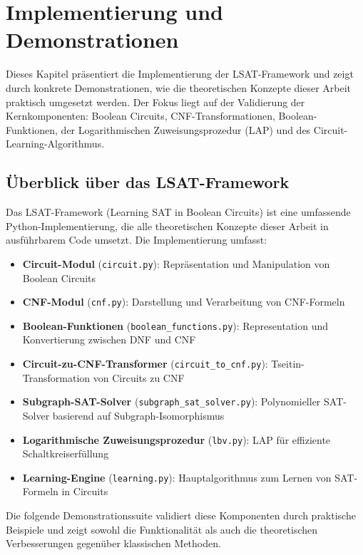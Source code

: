 ﻿\documentclass[a4paper,12pt]{article}
\theoremstyle{definition}
\begin{document}
\section{Implementierung und Demonstrationen}

Dieses Kapitel präsentiert die Implementierung der LSAT-Framework und zeigt durch konkrete Demonstrationen, wie die theoretischen Konzepte dieser Arbeit praktisch umgesetzt werden. Der Fokus liegt auf der Validierung der Kernkomponenten: Boolean Circuits, CNF-Transformationen, Boolean-Funktionen, der Logarithmischen Zuweisungsprozedur (LAP) und des Circuit-Learning-Algorithmus.

\subsection{Überblick über das LSAT-Framework}

Das LSAT-Framework (Learning SAT in Boolean Circuits) ist eine umfassende Python-Implementierung, die alle theoretischen Konzepte dieser Arbeit in ausführbarem Code umsetzt. Die Implementierung umfasst:

\begin{itemize}
    \item \textbf{Circuit-Modul} (\texttt{circuit.py}): Repräsentation und Manipulation von Boolean Circuits
    \item \textbf{CNF-Modul} (\texttt{cnf.py}): Darstellung und Verarbeitung von CNF-Formeln
    \item \textbf{Boolean-Funktionen} (\texttt{boolean\_functions.py}): Representation und Konvertierung zwischen DNF und CNF
    \item \textbf{Circuit-zu-CNF-Transformer} (\texttt{circuit\_to\_cnf.py}): Tseitin-Transformation von Circuits zu CNF
    \item \textbf{Subgraph-SAT-Solver} (\texttt{subgraph\_sat\_solver.py}): Polynomieller SAT-Solver basierend auf Subgraph-Isomorphismus
    \item \textbf{Logarithmische Zuweisungsprozedur} (\texttt{lbv.py}): LAP für effiziente Schaltkreiserfüllung
    \item \textbf{Learning-Engine} (\texttt{learning.py}): Hauptalgorithmus zum Lernen von SAT-Formeln in Circuits
\end{itemize}

Die folgende Demonstrationssuite validiert diese Komponenten durch praktische Beispiele und zeigt sowohl die Funktionalität als auch die theoretischen Verbesserungen gegenüber klassischen Methoden.
\end{document}
